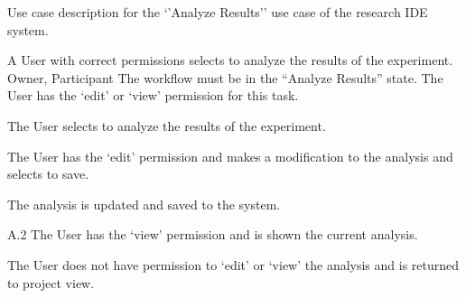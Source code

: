 \documentclass[document.tex]{subfiles}
\begin{document}
\begin{table}
  \centering
  \caption{Use case description for the `'Analyze Results'' use case of the research IDE system.}
  \label{tbl:use-case-analyze-results}

  \begin{usecase}
    A User with correct permissions selects to analyze the results of the experiment.
    Owner, Participant
    The workflow must be in the “Analyze Results” state. The User has the ‘edit’ or ‘view’ permission for this task.
    \ucnormal
    \begin{ucenum}
      \item The User selects to analyze the results of the experiment.
      \item The User has the ‘edit’ permission and makes a modification to the analysis and selects to save.
      \item The analysis is updated and saved to the system.
    \end{ucenum}
    \begin{ucenum}
      \item [A.2] The User has the ‘view’ permission and is shown the current analysis.
    \end{ucenum}
    The User does not have permission to ‘edit’ or ‘view’ the analysis and is returned to project view.
  \end{usecase}
\end{table}
\end{document}
